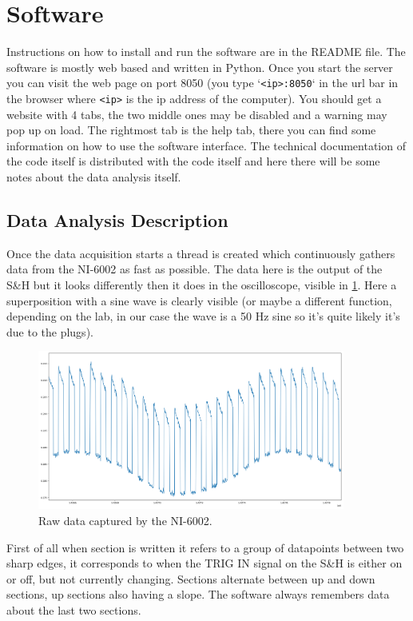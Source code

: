 \documentclass[a4paper, 10pt]{article}
\begin{document}
\section{Software}
Instructions on how to install and run the software are in the README file.
The software is mostly web based and written in Python.
Once you start the server you can visit the web page on port 8050 (you type `\lstinline{<ip>:8050}` in the url bar in the browser where \lstinline{<ip>} is the ip address of the computer).
You should get a website with 4 tabs, the two middle ones may be disabled and a warning may pop up on load.
The rightmost tab is the help tab, there you can find some information on how to use the software interface.
The technical documentation of the code itself is distributed with the code itself and here there will be some notes about the data analysis itself.

\subsection{Data Analysis Description}
Once the data acquisition starts a thread is created which continuously gathers data from the NI-6002 as fast as possible.
The data here is the output of the S\&H but it looks differently then it does in the oscilloscope, visible in \cref{fig:soft-raw-data}.
Here a superposition with a sine wave is clearly visible (or maybe a different function, depending on the lab, in our case the wave is a 50 \si{\hertz} sine so it's quite likely it's due to the plugs).

\begin{figure}[H]
    \centering
    \includegraphics[width=0.9\textwidth]{./images/soft-raw-data.png}
    \caption{Raw data captured by the NI-6002.}
    \label{fig:soft-raw-data}
\end{figure}

First of all when section is written it refers to a group of datapoints between two sharp edges, it corresponds to when the TRIG IN signal on the S\&H is either on or off, but not currently changing.
Sections alternate between up and down sections, up sections also having a slope.
The software always remembers data about the last two sections.
\end{document}
